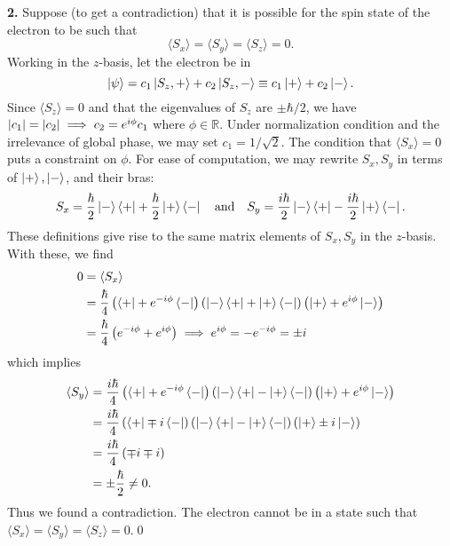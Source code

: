\documentclass{article}
\theoremstyle{definition}
\newcommand{\f}[2]{\frac{#1}{#2}}
\newcommand{\lp}{\left(}
\newcommand{\rp}{\right)}
\begin{document}
\noindent \textbf{2.} Suppose (to get a contradiction) that it is possible for the spin state of the electron to be such that
\begin{equation*}
\langle S_x \rangle = \langle S_y \rangle = \langle S_z \rangle = 0.
\end{equation*}
Working in the $z$-basis, let the electron be in 
\begin{equation*}
\ket{\psi} = c_1 \ket{S_z, +} + c_2 \ket{S_z, -} \equiv c_1 \ket{+} + c_2 \ket{-}. 
\end{equation*}
Since $\langle S_z \rangle = 0$ and that the eigenvalues of $S_z$ are $\pm \hbar/2$, we have $\abs{c_1} = \abs{c_2} \implies c_2 = e^{i\phi} c_1$ where $\phi \in \mathbb{R}$.  Under normalization condition and the irrelevance of global phase, we may set $c_1 =  1/\sqrt{2}$. The condition that $\langle S_x \rangle =0 $ puts a constraint on $\phi$. For ease of computation, we may rewrite $S_x, S_y$ in terms of $\ket{+}, \ket{-}$, and their bras:
\begin{equation*}
S_x = \f{\hbar}{2} \ket{-}\bra{+} + \f{\hbar}{2}\ket{+}\bra{-} \quad\text{and}\quad S_y = \f{i\hbar}{2} \ket{-}\bra{+} - \f{i\hbar}{2}\ket{+}\bra{-}.
\end{equation*}
These definitions give rise to the same matrix elements of $S_x,S_y$ in the $z$-basis. With these, we find
\begin{align*}
0 
&= \langle S_x \rangle \\
&= \f{\hbar}{4}\lp \bra{+} + e^{-i\phi} \bra{-} \rp \lp \ket{-}\bra{+} + \ket{+}\bra{-} \rp \lp \ket{+} + e^{i\phi} \ket{-} \rp\\
&= \f{\hbar}{4}\lp e^{-i\phi} + e^{i\phi}  \rp 
\implies e^{i\phi} = -e^{-i\phi} = \pm i
\end{align*}
which implies 
\begin{align*}
\langle S_y \rangle 
&= \f{i\hbar}{4}\lp \bra{+} + e^{-i\phi} \bra{-} \rp 
\lp \ket{-}\bra{+} - \ket{+}\bra{-}\rp 
\lp \ket{+} + e^{i\phi} \ket{-} \rp\\
&= \f{i\hbar}{4}\lp \bra{+} \mp i\bra{-} \rp 
\lp \ket{-}\bra{+} - \ket{+}\bra{-}\rp 
\lp \ket{+} \pm i \ket{-} \rp\\
&= \f{i\hbar}{4}\lp \mp i \mp i \rp \\
&= \pm \f{\hbar}{2}\neq 0.
\end{align*}
Thus we found a contradiction. The electron cannot be in a state such that $\langle S_x\rangle = \langle S_y \rangle = \langle S_z\rangle = 0$.\qed
\end{document}

